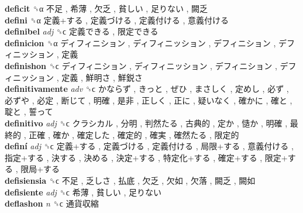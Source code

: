 \textbf{deficit} ␝α   不足 ,  希薄 ,  欠乏 ,  貧しい ,  足りない ,  闕乏   \\
\textbf{defini} ␝α   定義+する ,  定義づける ,  定義付ける ,  意義付ける   \\
\textbf{definibel} \emph{adj}  ␝ϲ   定義できる ,  限定できる   \\
\textbf{definicion} ␝α   ディフィニション ,  ディフィニッション ,  デフィニション ,  デフィニッション ,  定義   \\
\textbf{definishon} ␝ϲ   ディフィニション ,  ディフィニッション ,  デフィニション ,  デフィニッション ,  定義 ,  鮮明さ ,  鮮鋭さ   \\
\textbf{definitivamente} \emph{adv}  ␝ϲ   かならず ,  きっと ,  ぜひ ,  まさしく ,  定めし ,  必ず ,  必ずや ,  必定 ,  断じて ,  明確 ,  是非 ,  正しく ,  正に ,  疑いなく ,  確かに ,  確と ,  聢と ,  誓って   \\
\textbf{definitivo} \emph{adj}  ␝ϲ   クラシカル ,  分明 ,  判然たる ,  古典的 ,  定か ,  慥か ,  明確 ,  最終的 ,  正確 ,  確か ,  確定した ,  確定的 ,  確実 ,  確然たる ,  限定的   \\
\textbf{definí} \emph{adj}  ␝ϲ   定義+する ,  定義づける ,  定義付ける ,  局限+する ,  意義付ける ,  指定+する ,  決する ,  決める ,  決定+する ,  特定化+する ,  確定+する ,  限定+する ,  限局+する   \\
\textbf{defisiensia} ␝ϲ   不足 ,  乏しさ ,  払底 ,  欠乏 ,  欠如 ,  欠落 ,  闕乏 ,  闕如   \\
\textbf{defisiente} \emph{adj}  ␝ϲ   希薄 ,  貧しい ,  足りない   \\
\textbf{deflashon} \emph{n}  ␝ϲ   通貨収縮   \\
